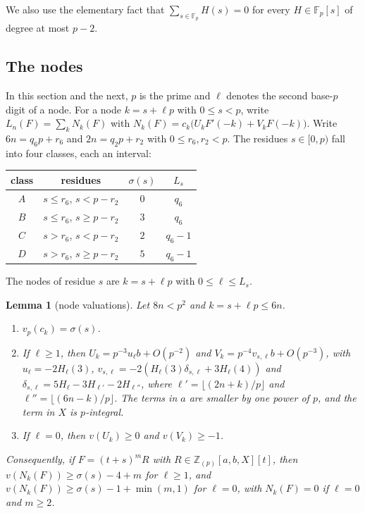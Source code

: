 \documentclass[11pt]{amsart}
\newtheorem{lemma}[theorem]{Lemma}
\theoremstyle{definition}
\theoremstyle{remark}
\numberwithin{equation}{section}
\newcommand{\Z}{\mathbb Z}
\newcommand{\F}{\mathbb F}
\begin{document}
We also use the elementary fact that $\sum_{s\in\F_p}H(s)=0$ for every $H\in\F_p[s]$ of degree at most $p-2$.

\subsection{The nodes}
In this section and the next, $p$ is the prime and $\ell$ denotes the second base-$p$ digit of a node. For a node
$k=s+\ell p$ with $0\le s<p$, write $L_n(F)=\sum_kN_k(F)$ with $N_k(F)=c_k\bigl(U_kF'(-k)+V_kF(-k)\bigr)$.
Write $6n=q_6p+r_6$ and $2n=q_2p+r_2$ with $0\le r_6,r_2<p$. The residues $s\in[0,p)$ fall into four classes, each an
interval:
\begin{center}
\renewcommand{\arraystretch}{1.15}
\begin{tabular}{@{}cccc@{}}
\toprule
class & residues & $\sigma(s)$ & $L_s$\\
\midrule
$A$ & $s\le r_6$, $s<p-r_2$ & $0$ & $q_6$\\
$B$ & $s\le r_6$, $s\ge p-r_2$ & $3$ & $q_6$\\
$C$ & $s>r_6$, $s<p-r_2$ & $2$ & $q_6-1$\\
$D$ & $s>r_6$, $s\ge p-r_2$ & $5$ & $q_6-1$\\
\bottomrule
\end{tabular}
\end{center}
The nodes of residue $s$ are $k=s+\ell p$ with $0\le\ell\le L_s$.

\begin{lemma}[node valuations]\label{lem:N}
Let $8n<p^2$ and $k=s+\ell p\le6n$.
\begin{enumerate}[label=(\roman*)]
\item $v_p(c_k)=\sigma(s)$.
\item If $\ell\ge1$, then $U_k=p^{-3}u_\ell b+O(p^{-2})$ and $V_k=p^{-4}v_{s,\ell}b+O(p^{-3})$, with $u_\ell=-2H_\ell(3)$,
 $v_{s,\ell}=-2(H_\ell(3)\delta_{s,\ell}+3H_\ell(4))$ and $\delta_{s,\ell}=5H_\ell-3H_{\ell'}-2H_{\ell''}$, where
 $\ell'=\lfloor(2n+k)/p\rfloor$ and $\ell''=\lfloor(6n-k)/p\rfloor$. The terms in $a$ are smaller by one power of $p$,
 and the term in $X$ is $p$-integral.
\item If $\ell=0$, then $v(U_k)\ge0$ and $v(V_k)\ge-1$.
\end{enumerate}
Consequently, if $F=(t+s)^mR$ with $R\in\Z_{(p)}[a,b,X][t]$, then $v(N_k(F))\ge\sigma(s)-4+m$ for $\ell\ge1$, and
$v(N_k(F))\ge\sigma(s)-1+\min(m,1)$ for $\ell=0$, with $N_k(F)=0$ if $\ell=0$ and $m\ge2$.
\end{lemma}
\end{document}
